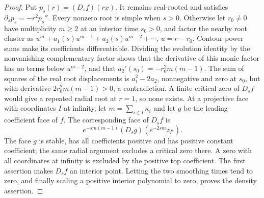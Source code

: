 \documentclass[reqno]{amsart}
\theoremstyle{definition}
\theoremstyle{remark}
\begin{document}
\begin{proof}
Put \(p_s(r)=(D_sf)(rx)\).  It remains real-rooted and satisfies
\(\partial_s p_s=-r^2p_s''\).
Every nonzero root is simple when \(s>0\).  Otherwise let \(r_0\ne0\) have
multiplicity \(m\ge2\) at an interior time \(s_0>0\), and factor the nearby root
cluster as
\(u^m+a_1(s)u^{m-1}+a_2(s)u^{m-2}+\cdots\), \(u=r-r_0\).
Contour power sums make its coefficients differentiable.  Dividing the evolution
identity by the nonvanishing complementary factor shows that the derivative
of this monic factor has no terms below \(u^{m-2}\), and that
\(a_2'(s_0)=-r_0^2m(m-1)\).
The sum of squares of the real root displacements is \(a_1^2-2a_2\), nonnegative
and zero at \(s_0\), but with derivative \(2r_0^2m(m-1)>0\), a contradiction.
A finite critical zero of \(D_sf\) would give a repeated radial root at \(r=1\),
so none exists.  At a projective face with coordinates \(I\) at infinity, let
\(m=\sum_{i\in I}\kappa_i\) and let \(g\) be the leading-coefficient face of \(f\).
The corresponding face of \(D_sf\) is
\[
 e^{-sm(m-1)}(D_sg)(e^{-2sm}z_{I^c}).
\]
The face \(g\) is stable, has all coefficients positive and has positive constant
coefficient; the same radial argument excludes a critical zero there.  A zero
with all coordinates at infinity is excluded by the positive top coefficient.
The first assertion makes \(D_sf\) an interior point.  Letting the two smoothing
times tend to zero, and finally scaling a positive interior polynomial to zero,
proves the density assertion.
\end{proof}
\end{document}
